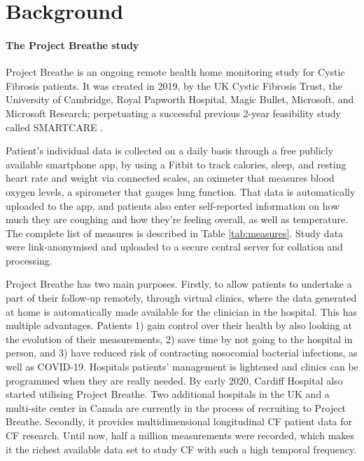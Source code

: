 \chapter{Background}  \label{sec:background}

\subsubsection{The Project Breathe study}
Project Breathe is an ongoing remote health home monitoring study for Cystic Fibrosis patients. It was created in 2019, by the UK Cystic Fibrosis Trust, the University of Cambridge, Royal Papworth Hospital, Magic Bullet, Microsoft, and Microsoft Research; perpetuating a successful previous 2-year feasibility study called SMARTCARE \cite{bach_2020}.

Patient’s individual data is collected on a daily basis through a free publicly available smartphone app, by using a Fitbit to track calories, sleep, and resting heart rate and weight via connected scales, an oximeter that measures blood oxygen levels, a spirometer that gauges lung function. That data is automatically uploaded to the app, and patients also enter self-reported information on how much they are coughing and how they’re feeling overall, as well as temperature. The complete list of measures is described in Table \ref{tab:measures}. Study data were link-anonymised and uploaded to a secure central server for collation and processing.

Project Breathe has two main purposes. Firstly, to allow patients to undertake a part of their follow-up remotely, through virtual clinics, where the data generated at home is automatically made available for the clinician in the hospital. This has multiple advantages. Patients 1) gain control over their health by also looking at the evolution of their measurements, 2) save time by not going to the hospital in person, and 3) have reduced risk of contracting nosocomial bacterial infections, as well as COVID-19. Hospitals patients' management is lightened and clinics can be programmed when they are really needed. By early 2020, Cardiff Hospital also started utilising Project Breathe. Two additional hospitals in the UK and a multi-site center in Canada are currently in the process of recruiting to Project Breathe.
Secondly, it provides multidimensional longitudinal CF patient data for CF research. Until now, half a million measurements were recorded, which makes it the richest available data set to study CF with such a high temporal frequency.

